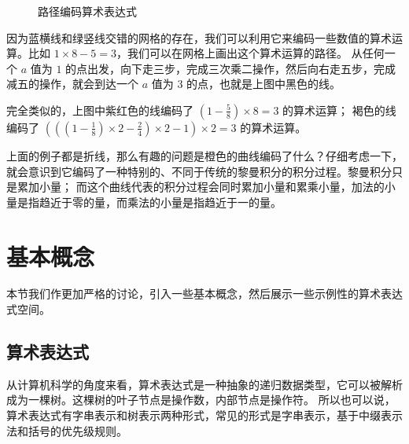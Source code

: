 \documentclass[a4paper,12pt]{book}
\numberwithin{problem}{section}
\numberwithin{definition}{section}
\numberwithin{lemma}{section}
\numberwithin{proposition}{section}
\numberwithin{theorem}{section}
\numberwithin{grammar}{section}
\numberwithin{program}{section}
\numberwithin{convention}{section}
\numberwithin{corollary}{section}
\begin{document}
\begin{figure}[ht]\centering
{}
\caption{路径编码算术表达式}\label{fig:encoding}
\end{figure}

因为蓝横线和绿竖线交错的网格的存在，我们可以利用它来编码一些数值的算术运算。比如 $1 \times 8 - 5 = 3$，我们可以在网格上画出这个算术运算的路径。
从任何一个 $a$ 值为 $1$ 的点出发，向下走三步，完成三次乘二操作，然后向右走五步，完成减五的操作，就会到达一个 $a$ 值为 $3$ 的点，也就是上图中黑色的线。

完全类似的，上图中紫红色的线编码了 $(1 - \frac{5}{8}) \times 8 = 3$ 的算术运算；
褐色的线编码了 $(((1 - \frac{1}{8}) \times 2 - \frac{2}{4}) \times 2 - 1) \times 2 = 3$ 的算术运算。

上面的例子都是折线，那么有趣的问题是橙色的曲线编码了什么？仔细考虑一下，就会意识到它编码了一种特别的、不同于传统的黎曼积分的积分过程。黎曼积分只是累加小量；
而这个曲线代表的积分过程会同时累加小量和累乘小量，加法的小量是指趋近于零的量，而乘法的小量是指趋近于一的量。

\newpage

\chapter{基本概念}

本节我们作更加严格的讨论，引入一些基本概念，然后展示一些示例性的算术表达式空间。

\section{算术表达式}

从计算机科学的角度来看，算术表达式是一种抽象的递归数据类型，它可以被解析成为一棵树。这棵树的叶子节点是操作数，内部节点是操作符。
所以也可以说，算术表达式有字串表示和树表示两种形式，常见的形式是字串表示，基于中缀表示法和括号的优先级规则。
\end{document}

